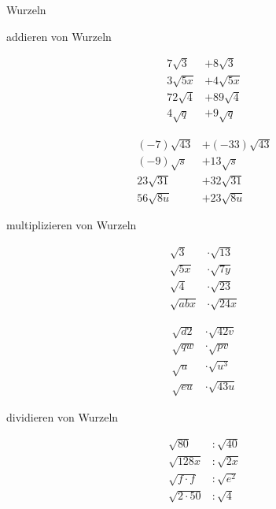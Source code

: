 \documentclass[12pt]{article}
\begin{document}
\begin{section}{Wurzeln}
	\begin{subsection}{addieren von Wurzeln}
	\begin{multicols}{2}    
        \begin{align*}  
		7 \sqrt{3} 	&+		8 \sqrt{3}	\\
		3 \sqrt{5x}	&+		4 \sqrt{5x}	\\
		72 \sqrt{4}	&+	   89 \sqrt{4}	\\
		4 \sqrt{q} 	&+		9 \sqrt{q}	
		\end{align*}    

        \begin{align*}
        (-7) \sqrt{43} 	&+	(-33) \sqrt{43}	\\
		(-9) \sqrt{s}	&+	13 \sqrt{s}		\\
		23 \sqrt{31}	&+	32 \sqrt{31}	\\
		56 \sqrt{8u} 	&+	23 \sqrt{8u}
        \end{align*}
        \end{multicols}
	\end{subsection}
	
	\begin{subsection}{multiplizieren von Wurzeln}
	\begin{multicols}{2}    
        \begin{align*}  
		\sqrt{3} 	&\cdot	\sqrt{13}		\\
		\sqrt{5x}	&\cdot	\sqrt{7y}		\\
		\sqrt{4}	&\cdot  \sqrt{23}		\\
		\sqrt{abx} 	&\cdot	\sqrt{24x}	
		\end{align*}    

        \begin{align*}
        \sqrt{d2} 	&\cdot	\sqrt{42v}		\\
		\sqrt{qw}	&\cdot	\sqrt{pv}		\\
		\sqrt{u}	&\cdot	\sqrt{u^{3}}	\\
		\sqrt{eu} 	&\cdot	\sqrt{43u}
        \end{align*}
        \end{multicols}
	\end{subsection}

	\begin{subsection}{dividieren von Wurzeln}
	\begin{multicols}{2}    
        \begin{align*}  
		\sqrt{80} 		&:	\sqrt{40}		\\
		\sqrt{128x}		&:	\sqrt{2x}		\\
		\sqrt{f \cdot f}&:  \sqrt{e^{2}}	\\
		\sqrt{2 \cdot 50}&:	\sqrt{4}	
		\end{align*}    


\end{multicols}
\end{subsection}
\end{section}
\end{document}
